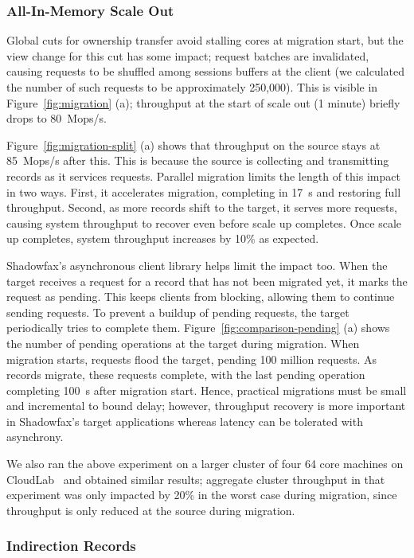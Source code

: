 \subsubsection{All-In-Memory Scale Out}

Global cuts for ownership transfer avoid stalling cores at migration start, but
the view change for this cut has some impact; request batches are invalidated,
causing requests to be shuffled among sessions buffers at the client
(we calculated the number of such requests to be approximately 250,000).
%
This is visible in Figure~\ref{fig:migration} (a); throughput at the
start of scale out (1 minute) briefly drops to 80~Mops/s.

Figure~\ref{fig:migration-split} (a) shows that throughput on the source
stays at 85~Mops/s after this.
%
This is because the source is collecting and transmitting records as it
services requests.
%
Parallel migration limits the length of this impact in two ways.
%
First, it accelerates migration, completing in 17~s and restoring full
throughput.
%
Second, as more records shift to the target, it
serves more requests, causing system throughput to recover
even before scale up completes.
%
Once scale up completes, system throughput increases by 10\% as expected.

Shadowfax's asynchronous client library helps limit the
impact too.
%
When the target receives a request for a record that has not been
migrated yet, it marks the request as pending.
%
This keeps clients from blocking, allowing them to
continue sending requests.
%
To prevent a buildup of pending requests, the target periodically tries to complete them.
%
Figure~\ref{fig:comparison-pending} (a) shows the number of pending operations at the
target during migration.
%
When migration starts, requests flood the target, pending 100 million requests.
%
As records migrate, these requests complete, with the last pending operation
completing 100~s after migration start.
%
Hence, practical migrations must be small and incremental to bound
delay; however, throughput recovery is more important in Shadowfax's target
applications whereas latency can be tolerated with asynchrony.

We also ran the above experiment on a larger cluster of four 64 core machines
on CloudLab~\cite{cloudlab} and obtained similar results; aggregate cluster
throughput in that experiment was only impacted by 20\% in the worst case
during migration, since throughput is only reduced at the source during
migration.

\subsubsection{Indirection Records}
\label{sec:eval:migration:indir}

